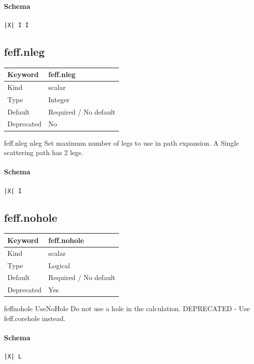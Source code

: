 \documentclass[11pt]{article}
\begin{document}
{{{{\paragraph{Schema}
\begin{Verbatim}
|X| I I
\end{Verbatim}

\subsection{feff.nleg}
\label{kw:feff-nleg}
\begin{longtable}{|p{1.5in}|p{4.5in}|}
\hline
Keyword & feff.nleg \\
\hline
Kind & scalar \\
\hline
Type & Integer \\
\hline
Default & Required / No default \\
\hline
Deprecated & No \\
\hline
\end{longtable}
 feff.nleg{ nleg }
 Set maximum number of legs to use in path expansion. A Single scattering
 path has 2 legs.

\paragraph{Schema}
\begin{Verbatim}
|X| I
\end{Verbatim}

\subsection{feff.nohole}
\label{kw:feff-nohole}
\begin{longtable}{|p{1.5in}|p{4.5in}|}
\hline
Keyword & feff.nohole \\
\hline
Kind & scalar \\
\hline
Type & Logical \\
\hline
Default & Required / No default \\
\hline
Deprecated & Yes \\
\hline
\end{longtable}
 feffnohole{ UseNoHole }
 Do not use a hole in the calculation.
 DEPRECATED - Use feff.corehole instead.

\paragraph{Schema}
\begin{Verbatim}
|X| L
\end{Verbatim}

}}}}
\end{document}
